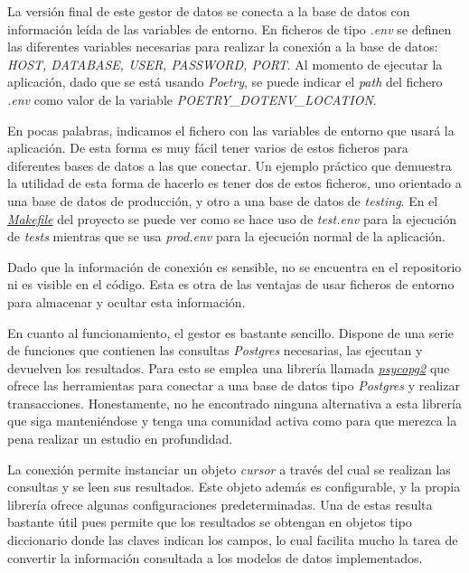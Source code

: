 La versión final de este gestor de datos se conecta a la base de datos con información leída de las variables de entorno. En ficheros de tipo \textit{.env} se definen las diferentes variables necesarias para realizar la conexión a la base de datos: \textit{HOST, DATABASE, USER, PASSWORD, PORT}. Al momento de ejecutar la aplicación, dado que se está usando \textit{Poetry}, se puede indicar el \textit{path} del fichero \textit{.env} como valor de la variable \textit{POETRY\_DOTENV\_LOCATION}. 

En pocas palabras, indicamos el fichero con las variables de entorno que usará la aplicación. De esta forma es muy fácil tener varios de estos ficheros para diferentes bases de datos a las que conectar. Un ejemplo práctico que demuestra la utilidad de esta forma de hacerlo es tener dos de estos ficheros, uno orientado a una base de datos de producción, y otro a una base de datos de \textit{testing}. En el \href{https://github.com/Anglepi/My-Many-Reads/blob/main/Makefile}{\textit{Makefile}} del proyecto se puede ver como se hace uso de \textit{test.env} para la ejecución de \textit{tests} mientras que se usa \textit{prod.env} para la ejecución normal de la aplicación.

Dado que la información de conexión es sensible, no se encuentra en el repositorio ni es visible en el código. Esta es otra de las ventajas de usar ficheros de entorno para almacenar y ocultar esta información.

En cuanto al funcionamiento, el gestor es bastante sencillo. Dispone de una serie de funciones que contienen las consultas \textit{Postgres} necesarias, las ejecutan y devuelven los resultados. Para esto se emplea una librería llamada \href{https://pypi.org/project/psycopg2/}{\textit{psycopg2}} que ofrece las herramientas para conectar a una base de datos tipo \textit{Postgres} y realizar transacciones. Honestamente, no he encontrado ninguna alternativa a esta librería que siga manteniéndose y tenga una comunidad activa como para que merezca la pena realizar un estudio en profundidad.

La conexión permite instanciar un objeto \textit{cursor} a través del cual se realizan las consultas y se leen sus resultados. Este objeto además es configurable, y la propia librería ofrece algunas configuraciones predeterminadas. Una de estas resulta bastante útil pues permite que los resultados se obtengan en objetos tipo diccionario donde las claves indican los campos, lo cual facilita mucho la tarea de convertir la información consultada a los modelos de datos implementados.

